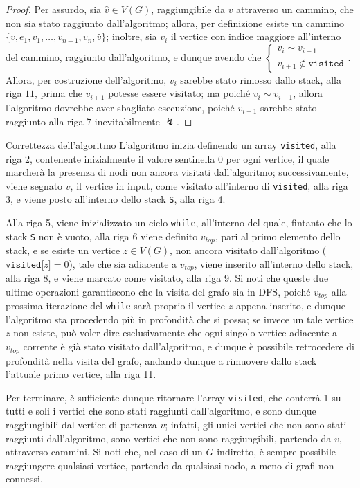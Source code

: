 \documentclass[a4paper, 12pt]{report}
\begin{document}
    \begin{proof}
        Per assurdo, sia $\hat v \in V(G)$, raggiungibile da $v$ attraverso un cammino, che non sia stato raggiunto dall'algoritmo; allora, per definizione esiste un cammino $\{v, e_1, v_1, \ldots, v_{n - 1}, v_n, \hat v\}$; inoltre, sia $v_i$ il vertice con indice maggiore all'interno del cammino, raggiunto dall'algoritmo, e dunque avendo che $\left \{ \begin{array}{l}v_i \sim v_{i + 1} \\ v_{i + 1} \notin \texttt{visited}  \end{array} \right.$. Allora, per costruzione dell'algoritmo, $v_i$ sarebbe stato rimosso dallo stack, alla riga $11$, prima che $v_{i + 1}$ potesse essere visitato; ma poiché $v_i \sim v_{i +1}$, allora l'algoritmo dovrebbe aver sbagliato esecuzione, poiché $v_{i +1}$ sarebbe stato raggiunto alla riga $7$ inevitabilmente $\lightning$.
    \end{proof}

    \begin{framedobs}{Correttezza dell'algoritmo}
        L'algoritmo inizia definendo un array \texttt{visited}, alla riga 2, contenente inizialmente il valore sentinella 0 per ogni vertice, il quale marcherà la presenza di nodi non ancora visitati dall'algoritmo; successivamente, viene segnato $v$, il vertice in input, come visitato all'interno di \texttt{visited}, alla riga 3, e viene posto all'interno dello stack \texttt{S}, alla riga 4.

        Alla riga 5, viene inizializzato un ciclo \texttt{while}, all'interno del quale, fintanto che lo stack \texttt{S} non è vuoto, alla riga 6 viene definito $v_{top}$, pari al primo elemento dello stack, e se esiste un vertice $z \in V(G)$, non ancora visitato dall'algoritmo ($\texttt{visited[}z\texttt{]}=0$), tale che sia adiacente a $v_{top}$, viene inserito all'interno dello stack, alla riga 8, e viene marcato come visitato, alla riga 9. Si noti che queste due ultime operazioni garantiscono che la visita del grafo sia in DFS, poiché $v_{top}$ alla prossima iterazione del \texttt{while} sarà proprio il vertice $z$ appena inserito, e dunque l'algoritmo sta procedendo più in profondità che si possa; se invece un tale vertice $z$ non esiste, può voler dire esclusivamente che ogni singolo vertice adiacente a $v_{top}$ corrente è già stato visitato dall'algoritmo, e dunque è possibile retrocedere di profondità nella visita del grafo, andando dunque a rimuovere dallo stack l'attuale primo vertice, alla riga 11.

        Per terminare, è sufficiente dunque ritornare l'array \texttt{visited}, che conterrà 1 su tutti e soli i vertici che sono stati raggiunti dall'algoritmo, e sono dunque raggiungibili dal vertice di partenza $v$; infatti, gli unici vertici che non sono stati raggiunti dall'algoritmo, sono vertici che non sono raggiungibili, partendo da $v$, attraverso cammini. Si noti che, nel caso di un $G$ indiretto, è sempre possibile raggiungere qualsiasi vertice, partendo da qualsiasi nodo, a meno di grafi non connessi.
    \end{framedobs}
\end{document}

